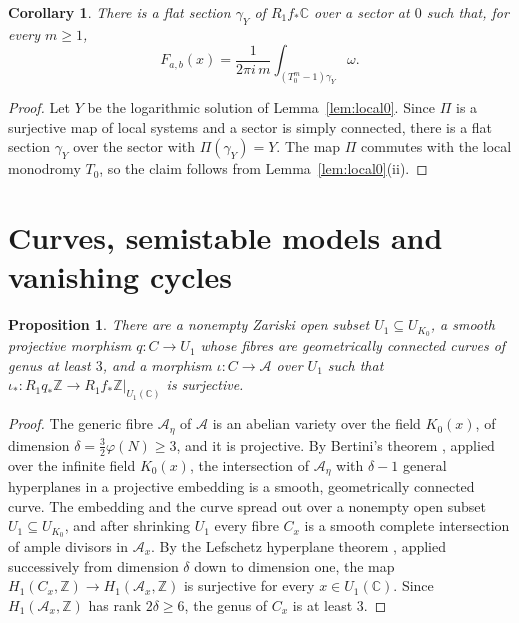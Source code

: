 \documentclass[11pt]{amsart}
\newtheorem{proposition}[theorem]{Proposition}
\newtheorem{corollary}[theorem]{Corollary}
\theoremstyle{definition}
\theoremstyle{remark}
\numberwithin{equation}{section}
\newcommand{\Z}{\mathbb{Z}}
\newcommand{\C}{\mathbb{C}}
\newcommand{\cA}{\mathcal{A}}
\newcommand{\Fab}{F_{a,b}}
\begin{document}
\begin{corollary}\label{cor:periodH}
There is a flat section $\gamma_Y$ of $R_1f_*\C$ over a sector at $0$ such that, for every $m\ge1$,
\[
\Fab(x)=\frac1{2\pi i\,m}\int_{(T_0^m-1)\gamma_Y}\omega .
\]
\end{corollary}

\begin{proof}
Let $Y$ be the logarithmic solution of Lemma~\ref{lem:local0}. Since $\Pi$ is a surjective map of local systems and a sector is simply connected, there is a flat section $\gamma_Y$ over the sector with $\Pi(\gamma_Y)=Y$. The map $\Pi$ commutes with the local monodromy $T_0$, so the claim follows from Lemma~\ref{lem:local0}(ii).
\end{proof}

\section{Curves, semistable models and vanishing cycles}\label{sec:curves}

\begin{proposition}\label{prop:curves}
There are a nonempty Zariski open subset $U_1\subseteq U_{K_0}$, a smooth projective morphism $q:C\to U_1$ whose fibres are geometrically connected curves of genus at least $3$, and a morphism $\iota:C\to\cA$ over $U_1$ such that $\iota_*:R_1q_*\Z\to R_1f_*\Z|_{U_1(\C)}$ is surjective.
\end{proposition}

\begin{proof}
The generic fibre $\cA_\eta$ of $\cA$ is an abelian variety over the field $K_0(x)$, of dimension $\delta=\frac32\varphi(N)\ge3$, and it is projective. By Bertini's theorem \citep[\S6]{Jouanolou1983}, applied over the infinite field $K_0(x)$, the intersection of $\cA_\eta$ with $\delta-1$ general hyperplanes in a projective embedding is a smooth, geometrically connected curve. The embedding and the curve spread out over a nonempty open subset $U_1\subseteq U_{K_0}$, and after shrinking $U_1$ every fibre $C_x$ is a smooth complete intersection of ample divisors in $\cA_x$. By the Lefschetz hyperplane theorem \citep[\S3.1]{Lazarsfeld2004}, applied successively from dimension $\delta$ down to dimension one, the map $H_1(C_x,\Z)\to H_1(\cA_x,\Z)$ is surjective for every $x\in U_1(\C)$. Since $H_1(\cA_x,\Z)$ has rank $2\delta\ge6$, the genus of $C_x$ is at least $3$.
\end{proof}
\end{document}
